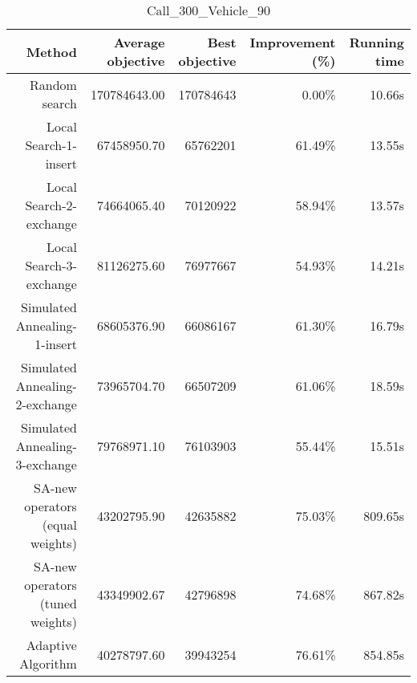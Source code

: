 \begin{table}[ht]
\centering
\caption{Call\_300\_Vehicle\_90}
\label{tab:call300vehicle90}
\begin{tabular}{|r|r|r|r|r|}
Method & Average objective & Best objective & Improvement (\%) & Running time \\
\hline
Random search & 170784643.00 & 170784643 & 0.00\% & 10.66s\\
Local Search-1-insert & 67458950.70 & 65762201 & 61.49\% & 13.55s\\
Local Search-2-exchange & 74664065.40 & 70120922 & 58.94\% & 13.57s\\
Local Search-3-exchange & 81126275.60 & 76977667 & 54.93\% & 14.21s\\
Simulated Annealing-1-insert & 68605376.90 & 66086167 & 61.30\% & 16.79s\\
Simulated Annealing-2-exchange & 73965704.70 & 66507209 & 61.06\% & 18.59s\\
Simulated Annealing-3-exchange & 79768971.10 & 76103903 & 55.44\% & 15.51s\\
SA-new operators (equal weights) & 43202795.90 & 42635882 & 75.03\% & 809.65s\\
SA-new operators (tuned weights) & 43349902.67 & 42796898 & 74.68\% & 867.82s\\
Adaptive Algorithm & 40278797.60 & 39943254 & 76.61\% & 854.85s\\
\end{tabular}%
\end{table}
